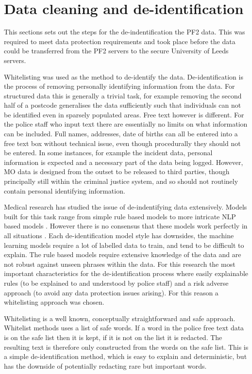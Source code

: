 \section{Data cleaning and de-identification} This sections sets out the steps for the de-indentification the PF2 data.  This was required to meet data protection requirements and took place before the data could be transferred from the PF2 servers to the secure University of Leeds servers.

Whitelisting was used as the method to de-identify the data. De-identification is the process of removing personally identifying information from the data. For structured data this is generally a trivial task, for example removing the second half of a postcode generalises the data sufficiently such that individuals can not be identified even in sparsely populated areas. Free text however is different. For the police staff who input text there are essentially no limits on what information can be included.  Full names, addresses, date of births can all be entered into a free text box without technical issue, even though procedurally they should not be entered. In some instances, for example the incident data, personal information is expected and a necessary part of the data being logged. However, MO data is designed from the outset to be released to third parties, though principally still within the criminal justice system, and so should not routinely contain personal identifying information.

Medical research has studied the issue of de-indentifying data extensively. Models built for this task range from simple rule based models to more intricate NLP based models \parencite{meystre2010automatic}. However there is no consensus that these models work perfectly in all situations \parencite{narayanan2014no}. Each de-identification model style has downsides, the machine learning models require a lot of labelled data to train, and tend to be difficult to explain. The rule based models require extensive knowledge of the data and are not robust against unseen phrases within the data. For this research the most important characteristics for the de-identification process where easily explainable rules (to be explained to and understood by police staff) and a risk adverse approach (to avoid any data protection issues arising). For this reason a whitelisting approach was chosen.

Whitelisting is a well known, conceptually straightforward and safe approach. Whitelist methods uses a list of safe words. If a word in the police free text data is  on the safe list then it is kept, if it is not on the list it is redacted. The resulting text is therefore only constructed from the words on the safe list. This is a simple de-identification method, which is easy to explain and deterministic, but has the downside of potentially redacting rare but important words. 

